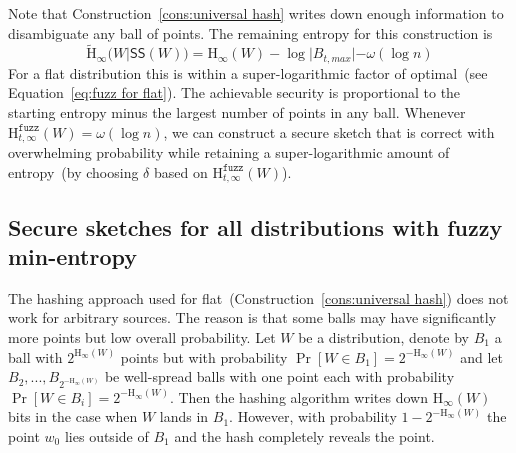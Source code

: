 \documentclass[11pt]{article}
\newcommand{\consref}[1]{\mbox{Construction~\ref{#1}}}
\newcommand{\class}[1]{{\ensuremath{\mathsf{#1}}}}
\newcommand{\sketch}{\ensuremath{\class{SS}}\xspace}
\newcommand{\dis}{\ensuremath{\mathsf{dis}}}
\newcommand{\Hoo}{\mathrm{H}_\infty}
\newcommand{\Hav}{\tilde{\mathrm{H}}_\infty}
\newcommand{\Hfuzz}{\mathrm{H}^{\mathtt{fuzz}}_{t,\infty}}
\begin{document}
Note that \consref{cons:universal hash} writes down enough information to disambiguate any ball of points.  The remaining entropy for this construction is 
\[
\Hav(W |\sketch(W)) = \Hoo(W) - \log |B_{t, max}| - \omega(\log n)
\]
For a flat distribution this is within a super-logarithmic factor of optimal~(see Equation~\eqref{eq:fuzz for flat}). The achievable security is proportional to the starting entropy minus the largest number of points in any ball.   Whenever $\Hfuzz(W) = \omega(\log n)$, we can construct a secure sketch that is correct with overwhelming probability while retaining a super-logarithmic amount of entropy~(by choosing $\delta$ based on $\Hfuzz(W)$).  %

\subsection{Secure sketches for all distributions with fuzzy min-entropy}
The hashing approach used for flat~(\consref{cons:universal hash}) does not work for arbitrary sources.  The reason is that some balls may have significantly more points but low overall probability.  Let $W$ be a distribution, denote by $B_1$ a ball with $2^{\Hoo(W)}$ points but with probability $\Pr[W\in B_1] =2^{-\Hoo(W)}$ and let $B_2,..., B_{2^{-\Hoo(W)}}$ be well-spread balls with one point each with probability $\Pr[W\in B_i] = 2^{-\Hoo(W)}$.  Then the hashing algorithm writes down $\Hoo(W)$ bits in the case when $W$ lands in $B_1$.  However, with probability $1-2^{-\Hoo(W)}$ the point $w_0$ lies outside of $B_1$ and the hash completely reveals the point.  
\end{document}
